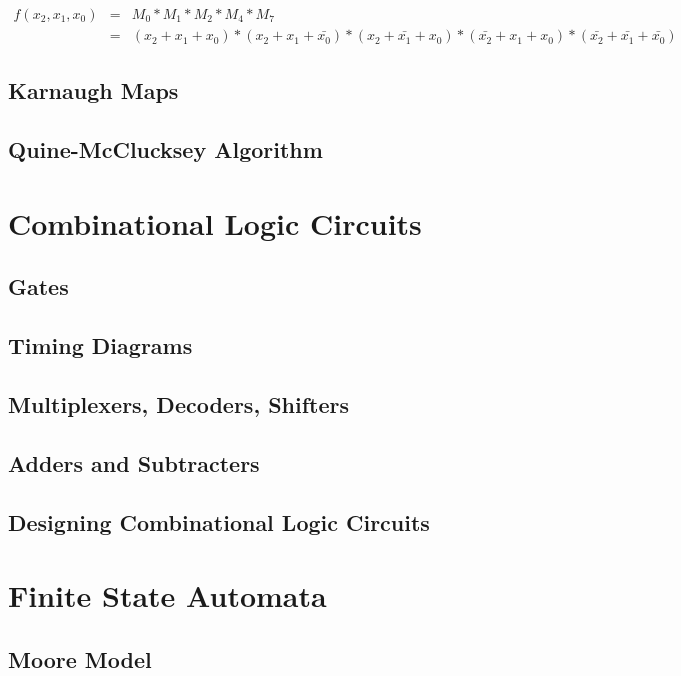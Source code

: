 \documentclass[11pt]{article}
\begin{document}
\begin{eqnarray*}
	f(x_2,x_1,x_0) &=& M_0 * M_1 * M_2 * M_4 * M_7\\
		&=& (x_2 + x_1 + x_0) * (x_2 + x_1 + \bar{x_0}) * (x_2 + \bar{x_1} + x_0) * (\bar{x_2} + x_1 + x_0) * (\bar{x_2} + \bar{x_1} + \bar{x_0})
\end{eqnarray*}

\subsection{Karnaugh Maps}

\subsection{Quine-McClucksey Algorithm}

\section{Combinational Logic Circuits}

\subsection{Gates}

\subsection{Timing Diagrams}

\subsection{Multiplexers, Decoders, Shifters}

\subsection{Adders and Subtracters}

\subsection{Designing Combinational Logic Circuits}

\section{Finite State Automata}

\subsection{Moore Model}
\end{document}
